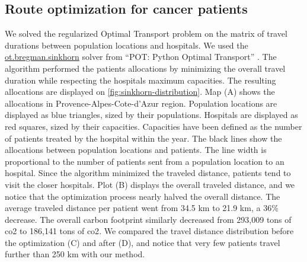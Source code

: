 \subsection{Route optimization for cancer patients}

We solved the regularized Optimal Transport problem on the matrix of travel
durations between population locations and hospitals. We used the
\href{https://pythonot.github.io/gen_modules/ot.bregman.html#ot.bregman.sinkhorn}{ot.bregman.sinkhorn}
solver from ``POT: Python Optimal Transport'' \cite{flamary_pot_2021}. The
algorithm performed the patients allocations by minimizing the overall travel
duration while respecting the hospitals maximum capacities. The resulting
allocations are displayed on \cref{fig:sinkhorn-distribution}. Map (A) shows the
allocations in Provence-Alpes-Cote-d'Azur region. Population locations are
displayed as blue triangles, sized by their populations. Hospitals are displayed
as red squares, sized by their capacities. Capacities have been defined as the
number of patients treated by the hospital within the year. The black lines show
the allocations between population locations and patients. The line width is
proportional to the number of patients sent from a population location to an
hospital. Since the algorithm minimized the traveled distance, patients tend to
visit the closer hospitals. Plot
(B) displays the overall traveled distance, and we notice that the optimization
process nearly halved the overall distance. The average traveled distance per
patient went from 34.5 km to 21.9 km, a 36\% decrease. The overall carbon
footprint similarly decreased from 293,009 tons of \ac{co2} to 186,141 tons of
\ac{co2}. We compared the travel distance distribution before the optimization
(C) and after (D), and notice that very few patients travel further than 250 km
with our method.

